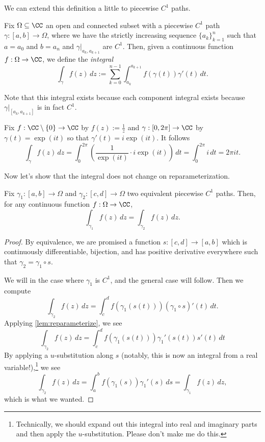 We can extend this definition a little to piecewise $C^1$ paths.
\begin{definition}[Integration]
	Fix $\Omega\subseteq\CC$ an open and connected subset with a piecewise $C^1$ path $\gamma:[a,b]\to\Omega$, where we have the strictly increasing sequence $\{a_k\}_{k=1}^n$ such that $a=a_0$ and $b=a_n$ and $\gamma|_{a_k,a_{k+1}}$ are $C^1$. Then, given a continuous function $f:\Omega\to\CC$, we define the \textit{integral}
	\[\int_\gamma f(z)\,dz:=\sum_{k=0}^{n-1}\int_{a_k}^{a_{k+1}}f(\gamma(t))\gamma'(t)\,dt.\]
\end{definition}
Note that this integral exists because each component integral exists because $\gamma|_{[a_k,a_{k+1}]}$ is in fact $C^1$.
\begin{example} \label{ex:windaround0}
	Fix $f:\CC\setminus\{0\}\to\CC$ by $f(z):=\frac1z$ and $\gamma:[0,2\pi]\to\CC$ by $\gamma(t)=\exp(it)$ so that $\gamma'(t)=i\exp(it)$. It follows
	\[\int_\gamma f(z)\,dz=\int_0^{2\pi}\left(\frac1{\exp(it)}\cdot i\exp(it)\right)\,dt=\int_0^{2\pi}i\,dt=2\pi it.\]
\end{example}
Now let's show that the integral does not change on reparameterization.
\begin{lemma} \label{lem:reparam}
	Fix $\gamma_1:[a,b]\to\Omega$ and $\gamma_2:[c,d]\to\Omega$ two equivalent piecewise $C^1$ paths. Then, for any continuous function $f:\Omega\to\CC$,
	\[\int_{\gamma_1}f(z)\,dz=\int_{\gamma_2}f(z)\,dz.\]
\end{lemma}
\begin{proof}
	By equivalence, we are promised a function $s:[c,d]\to[a,b]$ which is continuously differentiable, bijection, and has positive derivative everywhere such that $\gamma_2=\gamma_1\circ s$.

	We will in the case where $\gamma_1$ is $C^1$, and the general case will follow. Then we compute
	\[\int_{\gamma_2}f(z)\,dz=\int_c^df(\gamma_1(s(t)))(\gamma_1\circ s)'(t)\,dt.\]
	Applying \autoref{lem:reparameterize}, we see
	\[\int_{\gamma_2}f(z)\,dz=\int_c^df(\gamma_1(s(t)))\gamma_1'(s(t))s'(t)\,dt\]
	By applying a $u$-substitution along $s$ (notably, this is now an integral from a real variable!),\footnote{Technically, we should expand out this integral into real and imaginary parts and then apply the $u$-substitution. Please don't make me do this.} we see
	\[\int_{\gamma_2}f(z)\,dz=\int_a^bf(\gamma_1(s))\gamma_1'(s)\,ds=\int_{\gamma_1}f(z)\,dz,\]
	which is what we wanted.
\end{proof}

